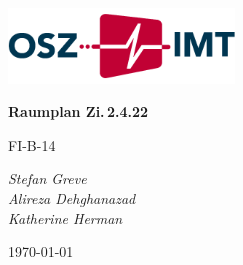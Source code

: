 \documentclass[a4paper]{article}
\newcommand*{\dAuthorOne}{Stefan Greve}
\newcommand*{\dAuthorTwo}{Alireza Dehghanazad}
\newcommand*{\dAuthorThree}{Katherine Herman}
\newcommand*{\dclass}{FI-B-14}
\newcommand*{\dtitle}{Raumplan Zi.\,2.4.22}
\begin{document}
\begin{titlepage}
    \centering
    \par\vspace{1cm}
    \includegraphics[width=0.45\textwidth]{images/logo.png}\par
    \vspace{3cm}
    {\Huge\bfseries\dtitle\par}
    {\LARGE\dclass\par}
    \vspace{1cm}
    {\LARGE\textit{\dAuthorOne\\\dAuthorTwo\\\dAuthorThree}\par}
    \vspace{1cm}
    {\large\today\par}
    \vfill
\end{titlepage}

\pagebreak


\end{document}
